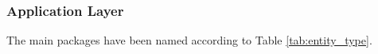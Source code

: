 \subsubsection{Application Layer}

The main packages have been named according to Table \ref{tab:entity_type}.